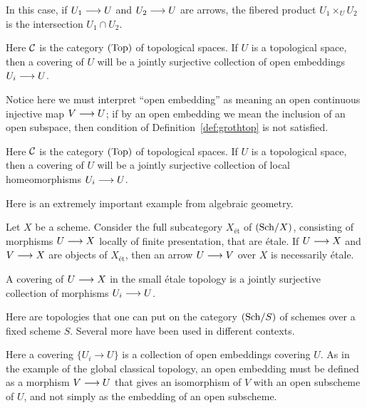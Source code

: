 \begin{2   CONTRAVARIANT FUNCTORS}
\begin{2.3 Sheaves in Grothendieck topologies}
\begin{example}
In this case, if $U_1 \arr U$ and $U_2 \arr U$ are arrows, the fibered product $U_1 \times_U U_2$ is the intersection $U_1 \cap U_2$.
\end{example}

\begin{example}\label{ex:global-classical}
Here $\mathcal{C}$ is the category $(\mathrm{Top})$ of topological spaces. If $U$ is a topological space, then a covering of $U$ will be a jointly surjective collection of open embeddings $U_i \arr U$.

Notice here we must interpret ``open embedding'' as meaning an open continuous injective map $V \arr U$; if by an open embedding we mean the inclusion of an open subspace, then condition  of Definition~\ref{def:grothtop} is not satisfied.
\end{example}

\begin{example}\label{ex:top-global-etale}
Here $\mathcal{C}$ is the category $(\mathrm{Top})$ of topological spaces. If $U$ is a topological space, then a covering of $U$ will be a jointly surjective collection of local homeomorphisms $U_i \arr U$.
\end{example}

Here is an extremely important example from algebraic geometry.

\begin{example}
Let $X$ be a scheme. Consider the full subcategory $X_{\textrm{\'et}}$ of $({\mathrm{Sch}/X})$, consisting of morphisms $U \arr X$ locally of finite presentation, that are \'etale. If $U \arr X$ and $V \arr X$ are objects of $X_{\textrm{\'et}}$, then an arrow $U \arr V$ over $X$ is necessarily \'etale.

A covering of $U \arr X$ in the small \'etale topology is a jointly surjective collection of morphisms $U_i \arr U$.
\end{example}

Here are topologies that one can put on the category $({\mathrm{Sch}/S})$ of schemes over a fixed scheme $S$. Several more have been used in different contexts.

\begin{example}
Here a covering $\{U_i \to U\}$ is a collection of open embeddings covering $U$. As in the example of the global classical topology, an open embedding must be defined as a morphism $V \arr U$ that gives an isomorphism of $V$ with an open subscheme of $U$, and not simply as the embedding of an open subscheme.
\end{example}


\end{2.3 Sheaves in Grothendieck topologies}
\end{2   CONTRAVARIANT FUNCTORS}
